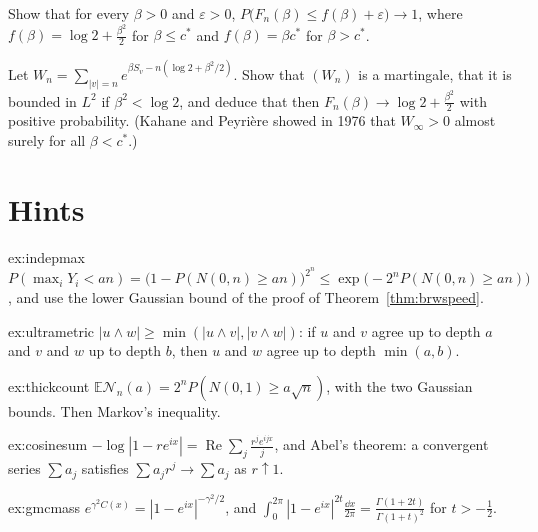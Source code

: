 \begin{exercise}[$\star\star$]\label{ex:freeup}
Show that for every $\beta>0$ and $\varepsilon>0$, $P\bigl(F_n(\beta)\le f(\beta)+\varepsilon\bigr)\to1$, where $f(\beta)=\log2+\frac{\beta^2}2$ for $\beta\le c^*$ and $f(\beta)=\beta c^*$ for $\beta>c^*$.
\end{exercise}

\begin{exercise}[$\star\star\star$]\label{ex:freelow}
Let $W_n=\sum_{|v|=n}e^{\beta S_v-n(\log2+\beta^2/2)}$. Show that $(W_n)$ is a martingale, that it is bounded in $L^2$ if $\beta^2<\log2$, and deduce that then $F_n(\beta)\to\log2+\frac{\beta^2}2$ with positive probability. (Kahane and Peyri\`ere showed in
1976 that $W_\infty>0$ almost surely for all $\beta<c^*$.)
\end{exercise}

\section{Hints}

\begin{hint}{ex:indepmax}
$P(\max_iY_i<an)=\bigl(1-P(N(0,n)\ge an)\bigr)^{2^n}\le\exp\bigl(-2^nP(N(0,n)\ge an)\bigr)$, and use the lower Gaussian bound of the proof of Theorem~\ref{thm:brwspeed}.
\end{hint}

\begin{hint}{ex:ultrametric}
$|u\wedge w|\ge\min(|u\wedge v|,|v\wedge w|)$: if $u$ and $v$ agree up to depth $a$ and $v$ and $w$ up to depth $b$, then $u$ and $w$ agree up to depth $\min(a,b)$.
\end{hint}

\begin{hint}{ex:thickcount}
$\mathbb E\mathcal N_n(a)=2^nP(N(0,1)\ge a\sqrt n)$, with the two Gaussian bounds. Then Markov's inequality.
\end{hint}

\begin{hint}{ex:cosinesum}
$-\log|1-re^{ix}|=\operatorname{Re}\sum_j\frac{r^je^{ijx}}j$, and Abel's theorem: a convergent series $\sum a_j$ satisfies $\sum a_jr^j\to\sum a_j$ as $r\uparrow1$.
\end{hint}

\begin{hint}{ex:gmcmass}
$e^{\gamma^2C(x)}=|1-e^{ix}|^{-\gamma^2/2}$, and $\int_0^{2\pi}|1-e^{ix}|^{2t}\frac{\dd x}{2\pi}=\frac{\Gamma(1+2t)}{\Gamma(1+t)^2}$ for $t>-\frac12$.
\end{hint}

